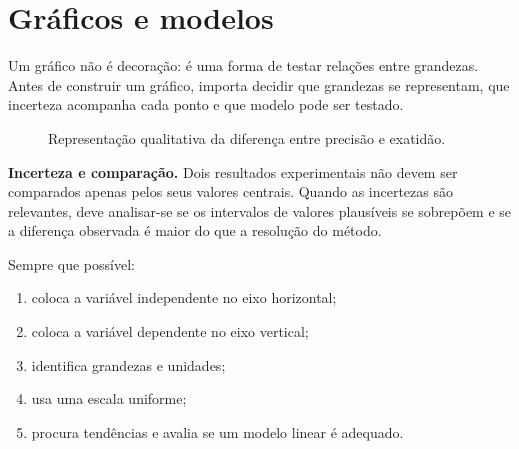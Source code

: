 \documentclass[11pt,a4paper,oneside]{book}
\begin{document}
\section{Gráficos e modelos}
Um gráfico não é decoração: é uma forma de testar relações entre grandezas. Antes de construir um gráfico, importa decidir que grandezas se representam, que incerteza acompanha cada ponto e que modelo pode ser testado.

\begin{figure}[H]
\centering
{}
\caption{Representação qualitativa da diferença entre precisão e exatidão.}
\end{figure}

\begin{conceito}
\textbf{Incerteza e comparação.} Dois resultados experimentais não devem ser comparados apenas pelos seus valores centrais. Quando as incertezas são relevantes, deve analisar-se se os intervalos de valores plausíveis se sobrepõem e se a diferença observada é maior do que a resolução do método.
\end{conceito} Sempre que possível:
\begin{enumerate}
  \item coloca a variável independente no eixo horizontal;
  \item coloca a variável dependente no eixo vertical;
  \item identifica grandezas e unidades;
  \item usa uma escala uniforme;
  \item procura tendências e avalia se um modelo linear é adequado.
\end{enumerate}

\begin{center}
\end{center}
\end{document}
